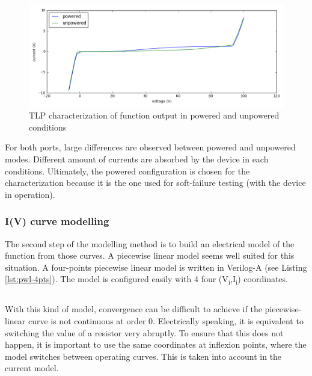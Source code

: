 \begin{figure}[!h]
  \centering
  \includegraphics[width=\textwidth]{src/4/figures/tlp_output_characterization.png}
  \caption{TLP characterization of function output in powered and unpowered conditions}
  \label{fig:tlp-output-cz}
\end{figure}

For both ports, large differences are observed between powered and unpowered modes.
Different amount of currents are absorbed by the device in each conditions.
Ultimately, the powered configuration is chosen for the characterization because it is the one used for soft-failure testing (with the device in operation).

\subsubsection{I(V) curve modelling}

The second step of the modelling method is to build an electrical model of the function from those curves.
A piecewise linear model seems well suited for this situation.
A four-points piecewise linear model is written in Verilog-A (see Listing \ref{lst:pwl-4pts}).
The model is configured easily with 4 four (V\textsubscript{i},I\textsubscript{i}) coordinates.

\begin{code}
\inputminted[frame=single]{verilog}{src/4/snippets/pwl_4pts.va}
\caption{Piecewise linear 4-points Verilog-A model}
\label{lst:pwl-4pts}
\end{code}

With this kind of model, convergence can be difficult to achieve if the piecewise-linear curve is not continuous at order 0.
Electrically speaking, it is equivalent to switching the value of a resistor very abruptly.
To ensure that this does not happen, it is important to use  the same coordinates at inflexion points, where the model switches between operating curves.
This is taken into account in the current model.

